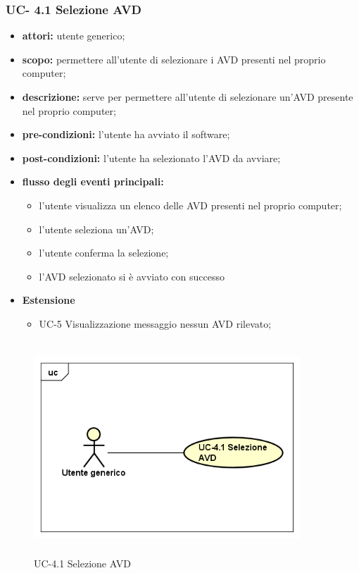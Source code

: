 \subsubsection{UC- 4.1 Selezione AVD}\label{subsubsec:uc--4.1-selezione-avd}
\begin{itemize}
    \item \textbf{attori:} utente generico;
    \item \textbf{scopo:} permettere all'utente di selezionare i AVD presenti nel proprio computer;
    \item \textbf{descrizione:} serve per permettere all'utente di selezionare un'AVD presente nel proprio computer;
    \item \textbf{pre-condizioni:} l'utente ha avviato il software;
    \item \textbf{post-condizioni:} l'utente ha selezionato l'AVD da avviare;
    \item \textbf{flusso degli eventi principali:}
    \begin{itemize}
        \item l'utente visualizza un elenco delle AVD presenti nel proprio computer;
        \item l'utente seleziona un'AVD;
        \item l'utente conferma la selezione;
        \item l'AVD selezionato si è avviato con successo
    \end{itemize}
    \item \textbf{Estensione}
    \begin{itemize}
        \item UC-5 Visualizzazione messaggio nessun AVD rilevato;
    \end{itemize}
\end{itemize}
\begin{figure}
    \centering
    \includegraphics[width=10cm, height=8cm]{./immagini/usecase/uc_4_1.png}
    \caption{UC-4.1 Selezione AVD}
\end{figure}

